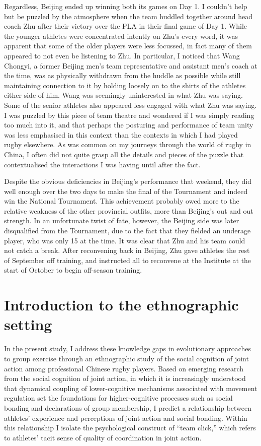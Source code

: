 \begin{CJK}{UTF8}{gbsn}
Regardless, Beijing ended up winning both its games on Day 1. I couldn't help but be puzzled by the atmosphere when the team huddled together around head coach Zhu after their victory over the PLA in their final game of Day 1.  While the younger athletes were concentrated intently on Zhu's every word, it was apparent that some of the older players were less focussed, in fact many of them appeared to not even be listening to Zhu.  In particular, I noticed that Wang Chongyi, a former Beijing men's team representative and assistant men's coach at the time, was as physically withdrawn from the huddle as possible while still maintaining connection to it by holding loosely on to the shirts of the athletes either side of him. Wang was seemingly uninterested in what Zhu was saying.  Some of the senior athletes also appeared less engaged with what Zhu was saying.  I was puzzled by this piece of team theatre and wondered if I was simply reading too much into it, and that perhaps the posturing and performance of team unity was less emphasised in this context than the contexts in which I had played rugby elsewhere. As was common on my journeys through the world of rugby in China, I often did not quite grasp all the details and pieces of the puzzle that contextualised the interactions I was having until after the fact.

Despite the obvious deficiencies in Beijing's performance that weekend, they did well enough over the two days to make the final of the Tournament and indeed win the National Tournament.  This achievement probably owed more to the relative weakness of the other provincial outfits, more than Beijing's out and out strength.  In an unfortunate twist of fate, however, the Beijing side was later disqualified from the Tournament, due to the fact that they fielded an underage player, who was only 15 at the time.  It was clear that Zhu and his team could not catch a break.  After reconvening back in Beijing, Zhu gave athletes the rest of September off training, and instructed all to reconvene at the Institute at the start of October to begin off-season training.




\section{Introduction to the ethnographic setting}
In the present study, I address these knowledge gaps in evolutionary approaches to group exercise through an ethnographic study of the social cognition of joint action among professional Chinese rugby players.  Based on emerging research from the social cognition of joint action, in which it is increasingly understood that dynamical coupling of lower-cognitive mechanisms associated with movement regulation set the foundations for higher-cognitive processes such as social bonding and declarations of group membership, I predict a relationship between athletes' experience and perceptions of joint action and social bonding.  Within this relationship I isolate the psychological construct of ``team click,'' which refers to athletes' tacit sense of quality of coordination in joint action.


\end{CJK}
